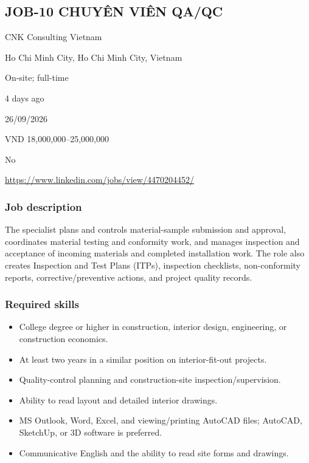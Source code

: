 \subsection{JOB-10 CHUYÊN VIÊN QA/QC}

\begin{description}[style=nextline,leftmargin=3.2cm]

\item[Company] CNK Consulting Vietnam

\item[Location] Ho Chi Minh City, Ho Chi Minh City, Vietnam

\item[Work arrangement] On-site; full-time

\item[Posting age shown] 4 days ago

\item[Verified on] 26/09/2026

\item[Salary] VND 18,000,000–25,000,000

\item[AI-related] No

\item[LinkedIn URL] \url{https://www.linkedin.com/jobs/view/4470204452/}

\end{description}

\subsubsection{Job description}

The specialist plans and controls material-sample submission and approval, coordinates material testing and conformity work, and manages inspection and acceptance of incoming materials and completed installation work. The role also creates Inspection and Test Plans (ITPs), inspection checklists, non-conformity reports, corrective/preventive actions, and project quality records.

\subsubsection{Required skills}

\begin{itemize}[leftmargin=1.5em]
\item College degree or higher in construction, interior design, engineering, or construction economics.
\item At least two years in a similar position on interior-fit-out projects.
\item Quality-control planning and construction-site inspection/supervision.
\item Ability to read layout and detailed interior drawings.
\item MS Outlook, Word, Excel, and viewing/printing AutoCAD files; AutoCAD, SketchUp, or 3D software is preferred.
\item Communicative English and the ability to read site forms and drawings.
\end{itemize}

